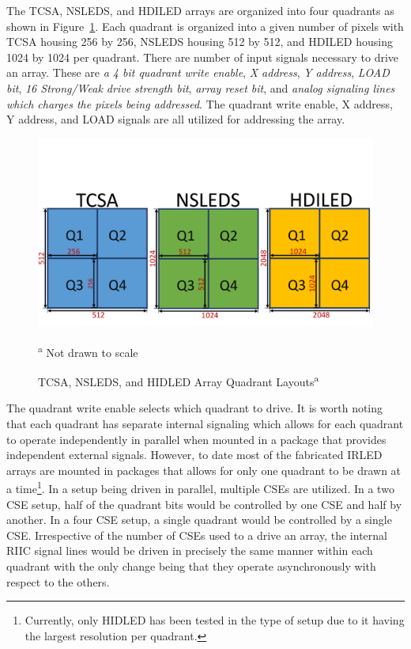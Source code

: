     The TCSA, NSLEDS, and HDILED arrays are organized into four quadrants as shown in Figure~\ref{fig:tcsa_nsleds_hdiled_quads}. Each quadrant is organized into a given number of pixels with TCSA housing 256 by 256, NSLEDS housing 512 by 512, and HDILED housing 1024 by 1024 per quadrant. There are number of input signals necessary to drive an array. These are {\em a 4 bit quadrant write enable}, {\em X address}, {\em Y address}, {\em LOAD bit}, {\em 16 Strong/Weak drive strength bit}, {\em array reset bit}, and {\em analog signaling lines which charges the pixels being addressed}. The quadrant write enable, X address, Y address, and LOAD signals are all utilized for addressing the array.

    \begin{figure}
        \centering
        \includegraphics[trim=0in 0.35in 0in 1.5in,width=1.0\textwidth]{fig/tcsa_nsleds_hdiled_quads.pdf}
        \caption[TCSA, NSLEDS, and HIDLED Array Quadrant Layouts]{TCSA, NSLEDS, and HIDLED Array Quadrant Layouts\textsuperscript{a}}
        \vspace{-8px}
        \footnotesize\textsuperscript{a} Not drawn to scale
        \label{fig:tcsa_nsleds_hdiled_quads}
    \end{figure}

    The quadrant write enable selects which quadrant to drive. It is worth noting that each quadrant has separate internal signaling which allows for each quadrant to operate independently in parallel when mounted in a package that provides independent external signals. However, to date most of the fabricated IRLED arrays are mounted in packages that allows for only one quadrant to be drawn at a time\footnote{Currently, only HIDLED has been tested in the type of setup\cite{lassiter1, LassiterEtAl2019_1, LassiterEtAl2019_2, lassiter3} due to it having the largest resolution per quadrant.}. In a setup being driven in parallel, multiple CSEs are utilized. In a two CSE setup, half of the quadrant bits would be controlled by one CSE and half by another. In a four CSE setup, a single quadrant would be controlled by a single CSE. Irrespective of the number of CSEs used to a drive an array, the internal RIIC signal lines would be driven in precisely the same manner within each quadrant with the only change being that they operate asynchronously with respect to the others.

